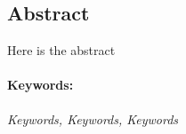 \subsection*{Abstract}
Here is the abstract
\paragraph{Keywords:}
\textit{Keywords, Keywords, Keywords}
